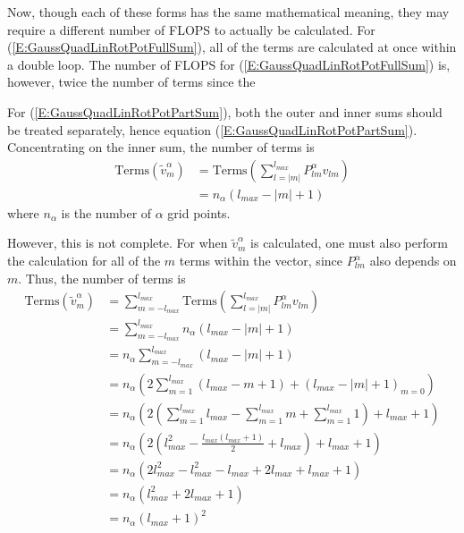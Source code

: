 \documentclass{revtex4-1}
\begin{document}
Now, though each of these forms has the same mathematical meaning, they may require a different number of FLOPS to actually be calculated. For (\ref{E:GaussQuadLinRotPotFullSum}), all of the terms are calculated at once within a double loop. The number of FLOPS for (\ref{E:GaussQuadLinRotPotFullSum}) is, however, twice the number of terms since the 


For (\ref{E:GaussQuadLinRotPotPartSum}), both the outer and inner sums should be treated separately, hence equation (\ref{E:GaussQuadLinRotPotPartSum}). Concentrating on the inner sum, the number of terms is
\begin{align}
\mbox{Terms}\!\left(\tilde{v}_{m}^{\alpha}\right) 	&= \mbox{Terms}\!\left(\sum_{l=|m|}^{l_{max}}P_{lm}^{\alpha}v_{lm}\right) \\
													&= n_{\alpha}\left(l_{max}-|m|+1\right)
\end{align}
where $n_{\alpha}$ is the number of $\alpha$ grid points.

However, this is not complete. For when $\tilde{v}_{m}^{\alpha}$ is calculated, one must also perform the calculation for all of the $m$ terms within the vector, since $P_{lm}^{\alpha}$ also depends on $m$. Thus, the number of terms is 
\begin{align}
\mbox{Terms}\!\left(\tilde{v}_{m}^{\alpha}\right) 	&= \sum_{m=-l_{max}}^{l_{max}}\mbox{Terms}\!\left(\sum_{l=|m|}^{l_{max}}P_{lm}^{\alpha}v_{lm}\right) \\
													&= \sum_{m=-l_{max}}^{l_{max}}n_{\alpha}\left(l_{max}-|m|+1\right)\\
													&= n_{\alpha}\sum_{m=-l_{max}}^{l_{max}}\left(l_{max}-|m|+1\right)\\
													&= n_{\alpha}\left(2\sum_{m=1}^{l_{max}}\left(l_{max}-m+1\right) + \left(l_{max}-|m|+1\right)_{m=0}\right) \\
													&= n_{\alpha}\left(2\left(\sum_{m=1}^{l_{max}}l_{max}-\sum_{m=1}^{l_{max}}m+\sum_{m=1}^{l_{max}}1\right) + l_{max}+1\right) \\
													&= n_{\alpha}\left(2\left(l_{max}^{2}-\frac{l_{max}\left(l_{max}+1\right)}{2}+l_{max}\right) + l_{max}+1\right) \\
													&= n_{\alpha}\left(2l_{max}^{2}-l_{max}^{2}-l_{max}+2l_{max}+l_{max}+1\right)\\
													&= n_{\alpha}\left(l_{max}^{2}+2l_{max}+1\right) \\
													&= n_{\alpha}\left(l_{max}+1\right)^{2}
\end{align}
\end{document}

